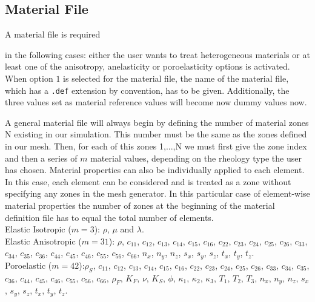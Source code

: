 \documentclass[12pt,twoside]{article}
\begin{document}
\newpage

\subsection{Material File}
\label{sec-matfile}

\hypertarget{material}{A material file is required} in the following cases: 
either the user wants to treat heterogeneous materials or 
at least one of the anisotropy, anelasticity or poroelasticity options is activated.
When option $1$ is selected for the material file, the name of the material file, which has a {\tt .def} extension by convention, 
has to be given.
Additionally, the three values set as material reference values will become now dummy values now.

\noindent
A general material file will always begin by defining the number of material zones N existing in our simulation.
This number must be the same as the zones defined in our mesh. 
Then, for each of this zones 1,...,N we must first give the zone index and then a series of $m$ material values, 
depending on the rheology type the user has chosen. 
Material properties can also be individually applied to each element.
In this case, each element can be considered and is treated as a zone without specifying any zones in the mesh generator.
In this particular case of element-wise material properties the number of zones at the beginning of
the material definition file has to equal the total number of elements.\\

\noindent
Elastic Isotropic ($m=3$): $\rho$, $\mu$ and $\lambda$.\\

\noindent
Elastic Anisotropic ($m=31$): $\rho$, $c_{11}$, $c_{12}$, $c_{13}$, $c_{14}$, $c_{15}$, $c_{16}$, $c_{22}$, $c_{23}$, $c_{24}$, $c_{25}$, $c_{26}$, $c_{33}$, $c_{34}$, $c_{35}$, 
$c_{36}$, $c_{44}$, $c_{45}$, $c_{46}$, $c_{55}$, $c_{56}$, $c_{66}$, $n_x$, $n_y$, $n_z$, $s_x$, $s_y$, $s_z$, $t_x$, $t_y$, $t_z$.\\

\noindent
Poroelastic ($m=42$):$\rho_S$, $c_{11}$, $c_{12}$, $c_{13}$, $c_{14}$, $c_{15}$, $c_{16}$, $c_{22}$, $c_{23}$, $c_{24}$, $c_{25}$, $c_{26}$, $c_{33}$, $c_{34}$, $c_{35}$, 
$c_{36}$, $c_{44}$, $c_{45}$, $c_{46}$, $c_{55}$, $c_{56}$, $c_{66}$, $\rho_F$, $K_F$, $\nu$, $K_S$, $\phi$, $\kappa_1$, $\kappa_2$, $\kappa_3$, $T_1$, $T_2$, $T_3$, $n_x$, 
$n_y$, $n_z$, $s_x$, $s_y$, $s_z$, $t_x$, $t_y$, $t_z$.\\
\end{document}
